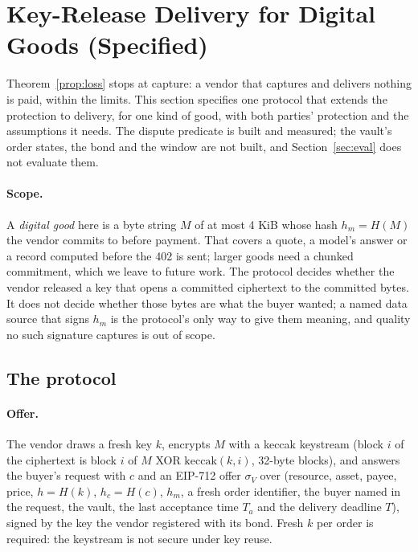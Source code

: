 \section{Key-Release Delivery for Digital Goods (Specified)}
\label{sec:delivery}

Theorem~\ref{prop:loss} stops at capture: a vendor that captures and delivers nothing is paid, within the limits. This section specifies one
protocol that extends the protection to delivery, for one kind of good, with both parties' protection and the assumptions it needs. The
dispute predicate is built and measured; the vault's order states, the bond and the window are not built, and Section~\ref{sec:eval} does not
evaluate them.

\paragraph{Scope.} A \emph{digital good} here is a byte string $M$ of at most 4 KiB whose hash $h_m = H(M)$ the vendor commits to before payment.
That covers a quote, a model's answer or a record computed before the 402 is sent; larger goods need a chunked commitment, which we leave to future work.
The protocol decides whether the vendor released a key that opens a committed ciphertext to the committed bytes. It does not decide whether those bytes
are what the buyer wanted; a named data source that signs $h_m$ is the protocol's only way to give them meaning, and quality no such signature captures is
out of scope.

\subsection{The protocol}

\paragraph{Offer.} The vendor draws a fresh key $k$, encrypts $M$ with a keccak keystream (block $i$ of the ciphertext is block $i$ of $M$ XOR
$\mathrm{keccak}(k, i)$, 32-byte blocks), and answers the buyer's request with $c$ and an EIP-712 offer $\sigma_V$ over (resource, asset, payee, price,
$h = H(k)$, $h_c = H(c)$, $h_m$, a fresh order identifier, the buyer named in the request, the vault, the last acceptance time $T_a$ and the delivery
deadline $T$), signed by the key the vendor registered with its bond. Fresh $k$ per order is required: the keystream is not secure under key reuse.

